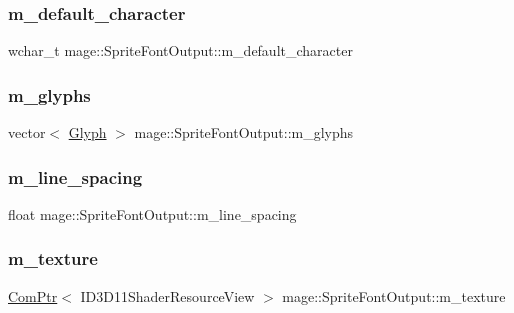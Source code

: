 \subsubsection{\texorpdfstring{m\+\_\+default\+\_\+character}{m\_default\_character}}
{\footnotesize\ttfamily wchar\+\_\+t mage\+::\+Sprite\+Font\+Output\+::m\+\_\+default\+\_\+character}

\hypertarget{structmage_1_1_sprite_font_output_aee63c847a919bce662dee371594607dd}{}\label{structmage_1_1_sprite_font_output_aee63c847a919bce662dee371594607dd} 
\subsubsection{\texorpdfstring{m\+\_\+glyphs}{m\_glyphs}}
{\footnotesize\ttfamily vector$<$ \hyperlink{structmage_1_1_glyph}{Glyph} $>$ mage\+::\+Sprite\+Font\+Output\+::m\+\_\+glyphs}

\hypertarget{structmage_1_1_sprite_font_output_adc36a5113ca2473efbc3aa7989606f28}{}\label{structmage_1_1_sprite_font_output_adc36a5113ca2473efbc3aa7989606f28} 
\subsubsection{\texorpdfstring{m\+\_\+line\+\_\+spacing}{m\_line\_spacing}}
{\footnotesize\ttfamily float mage\+::\+Sprite\+Font\+Output\+::m\+\_\+line\+\_\+spacing}

\hypertarget{structmage_1_1_sprite_font_output_a3e2f3b44decf05bc81ce91f4bf9ad092}{}\label{structmage_1_1_sprite_font_output_a3e2f3b44decf05bc81ce91f4bf9ad092} 
\subsubsection{\texorpdfstring{m\+\_\+texture}{m\_texture}}
{\footnotesize\ttfamily \hyperlink{namespacemage_ae74f374780900893caa5555d1031fd79}{Com\+Ptr}$<$ I\+D3\+D11\+Shader\+Resource\+View $>$ mage\+::\+Sprite\+Font\+Output\+::m\+\_\+texture}

